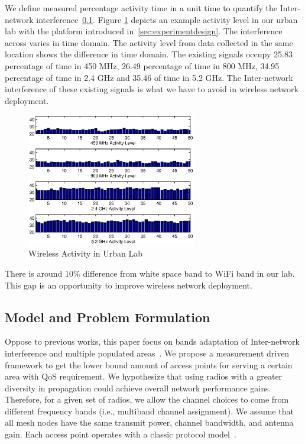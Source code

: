 We define measured percentage activity time in a unit time to 
quantify the Inter-network interference~\ref{subsec:problem}.
Figure \ref{fig:labact} depicts an example activity level in our urban lab
with the platform introduced in~\ref{sec:experimentdesign}. 
The interference across varies in time domain. The activity level from data
collected in the same location shows the difference in time domain.
The existing signals occupy 25.83 percentage of time in 450 MHz,
26.49 percentage of time in 800 MHz, 34.95 percentage of time in 
2.4 GHz and 35.46 of time in 5.2 GHz. The Inter-network interference 
of these existing signals is what we have to avoid in wireless network
 deployment. 
   \begin{figure}
   \centering
   \includegraphics[width=74mm]{figures/labactivity}
   \vspace{-0.1in}
   \caption{Wireless Activity in Urban Lab}                                                                 
   \label{fig:labact}
   \end{figure}
There is around $10\%$ difference from white space band to WiFi band in 
our lab. This gap is an opportunity to improve wireless network deployment.

\subsection{Model and Problem Formulation}
\label{subsec:problem}

Oppose to previous works, this paper focus on bands adaptation of Inter-network 
interference and multiple populated areas~\cite{tang2005interference,yuan2006cross
,si2010overview}. We propose a measurement driven framework to get the lower bound 
amount of access points for serving a certain area with QoS requirement.
 We hypothesize that using radios with a greater diversity in propagation could 
 achieve overall network performance gains.  Therefore, for a given set of radios,
  we allow the channel choices to come from different frequency bands 
  (i.e., multiband channel assignment). We assume that all mesh nodes have the same 
  transmit power, channel bandwidth, and antenna gain.
Each access point operates with a classic protocol model~\cite{gupta2000capacity}. 

